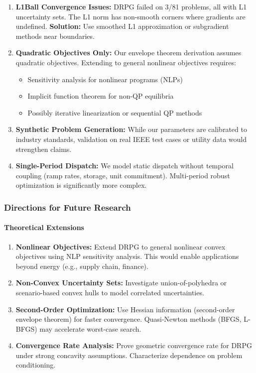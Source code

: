 \begin{enumerate}
    \item \textbf{L1Ball Convergence Issues:} DRPG failed on 3/81 problems, all with L1 uncertainty sets. The L1 norm has non-smooth corners where gradients are undefined. \textbf{Solution:} Use smoothed L1 approximation or subgradient methods near boundaries.

    \item \textbf{Quadratic Objectives Only:} Our envelope theorem derivation assumes quadratic objectives. Extending to general nonlinear objectives requires:
    \begin{itemize}
        \item Sensitivity analysis for nonlinear programs (NLPs)
        \item Implicit function theorem for non-QP equilibria
        \item Possibly iterative linearization or sequential QP methods
    \end{itemize}

    \item \textbf{Synthetic Problem Generation:} While our parameters are calibrated to industry standards, validation on real IEEE test cases or utility data would strengthen claims.

    \item \textbf{Single-Period Dispatch:} We model static dispatch without temporal coupling (ramp rates, storage, unit commitment). Multi-period robust optimization is significantly more complex.
\end{enumerate}

\subsubsection{Directions for Future Research}

\paragraph{Theoretical Extensions}

\begin{enumerate}
    \item \textbf{Nonlinear Objectives:} Extend DRPG to general nonlinear convex objectives using NLP sensitivity analysis. This would enable applications beyond energy (e.g., supply chain, finance).

    \item \textbf{Non-Convex Uncertainty Sets:} Investigate union-of-polyhedra or scenario-based convex hulls to model correlated uncertainties.

    \item \textbf{Second-Order Optimization:} Use Hessian information (second-order envelope theorem) for faster convergence. Quasi-Newton methods (BFGS, L-BFGS) may accelerate worst-case search.

    \item \textbf{Convergence Rate Analysis:} Prove geometric convergence rate for DRPG under strong concavity assumptions. Characterize dependence on problem conditioning.
\end{enumerate}

